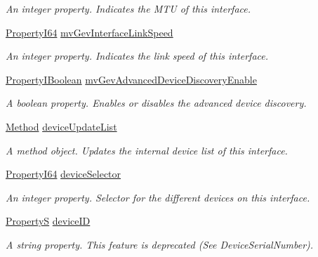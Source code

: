 \begin{DoxyCompactItemize}
\begin{DoxyCompactList}\small\item\em An integer property. Indicates the M\+T\+U of this interface. \end{DoxyCompactList}\item 
\hyperlink{group___common_interface_ga81749b2696755513663492664a18a893}{Property\+I64} \hyperlink{classmv_i_m_p_a_c_t_1_1acquire_1_1_gen_i_cam_1_1_interface_module_a2bcce0f05c0e58b30d670d9201b3fb6e}{mv\+Gev\+Interface\+Link\+Speed}
\begin{DoxyCompactList}\small\item\em An integer property. Indicates the link speed of this interface. \end{DoxyCompactList}\item 
\hyperlink{group___common_interface_ga44f9437e24b21b6c93da9039ec6786aa}{Property\+I\+Boolean} \hyperlink{classmv_i_m_p_a_c_t_1_1acquire_1_1_gen_i_cam_1_1_interface_module_a39377c773b525daf0d8bb65b42ce3fba}{mv\+Gev\+Advanced\+Device\+Discovery\+Enable}
\begin{DoxyCompactList}\small\item\em A boolean property. Enables or disables the advanced device discovery. \end{DoxyCompactList}\item 
\hyperlink{classmv_i_m_p_a_c_t_1_1acquire_1_1_method}{Method} \hyperlink{classmv_i_m_p_a_c_t_1_1acquire_1_1_gen_i_cam_1_1_interface_module_ad53de9bcfcf03c9a702bfdca359ebe7c}{device\+Update\+List}
\begin{DoxyCompactList}\small\item\em A method object. Updates the internal device list of this interface. \end{DoxyCompactList}\item 
\hyperlink{group___common_interface_ga81749b2696755513663492664a18a893}{Property\+I64} \hyperlink{classmv_i_m_p_a_c_t_1_1acquire_1_1_gen_i_cam_1_1_interface_module_a9cdc9d11a4b8003e4bc68ff4f47241e2}{device\+Selector}
\begin{DoxyCompactList}\small\item\em An integer property. Selector for the different devices on this interface. \end{DoxyCompactList}\item 
\hyperlink{classmv_i_m_p_a_c_t_1_1acquire_1_1_property_s}{Property\+S} \hyperlink{classmv_i_m_p_a_c_t_1_1acquire_1_1_gen_i_cam_1_1_interface_module_a44a420f9d0bf26a8d877026b3e12ea06}{device\+I\+D}
\begin{DoxyCompactList}\small\item\em A string property. This feature is deprecated (See Device\+Serial\+Number). \end{DoxyCompactList}\item 

\end{DoxyCompactItemize}
